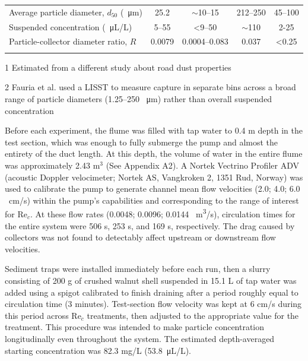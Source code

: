 \documentclass[geosciences,article,submit,moreauthors,pdftex]{Definitions/mdpi}
\newcommand\Rey{\mathrm{Re}}
\begin{document}
\begin{table}[h]
\begin{threeparttable}
\begin{tabular}{lcccc}
Average particle diameter, $d_{50}$ (\SI{}{\micro\metre})     
& 25.2        & $\sim$10--15 \tnote{2} & 212--250     & 45--100 \cite{hejduk2010variations,noe2010glades}  \\
Suspended concentration (\SI{}{\micro\liter/\liter})      
& 5--55   & <9--50 \tnote{2}      & $\sim$110   & 2-25 \cite{noe2010glades,aiona2013can}      \\
\midrule
Particle-collector diameter ratio, $R$      
&0.0079       &0.0004--0.083 \tnote{2} & 0.037        & <0.25     \\
\bottomrule
\vspace{-4mm}
\end{tabular}
\begin{tablenotes}
\footnotesize \item[1] Estimated from a different study about road dust properties \cite{mckenzie2008size} 
\vspace{2mm}
\footnotesize \item[2] Fauria et al. \cite{Fauria_2015} used a LISST to measure capture in separate bins across a broad range of particle diameters (1.25--250 \SI{}{\micro\metre}) rather than overall suspended concentration
\end{tablenotes}
\end{threeparttable}
\label{tbl:parameters}
\end{table}

Before each experiment, the flume was filled with tap water to 0.4 m depth in the test section, which was enough to fully submerge the pump and almost the entirety of the duct length. At this depth, the volume of water in the entire flume was approximately 2.43 m$^3$ (See Appendix A2).  A Nortek Vectrino Profiler ADV (acoustic Doppler velocimeter; Nortek AS, Vangkroken 2, 1351 Rud, Norway) was used to calibrate the pump to generate channel mean flow velocities (2.0; 4.0; 6.0 \SI{}{\centi\metre/\second}) within the pump's capabilities and corresponding to the range of interest for $\Rey_c$. At these flow rates (0.0048; 0.0096; 0.0144 \SI{}{\metre\cubed/\second}), circulation times for the entire system were 506 s, 253 s, and 169 s, respectively. The drag caused by collectors was not found to detectably affect upstream or downstream flow velocities.

Sediment traps were installed immediately before each run, then a slurry consisting of 200 g of crushed walnut shell suspended in 15.1 L of tap water was added using a spigot calibrated to finish draining after a period roughly equal to circulation time (3 minutes). Test-section flow velocity was kept at 6 cm/s during this period across $\Rey_c$ treatments, then adjusted to the appropriate value for the treatment. This procedure was intended to make particle concentration longitudinally even throughout the system. The estimated depth-averaged starting concentration was 82.3 mg/L (\SI{53.8}{\micro\liter/\liter}).
\end{document}
